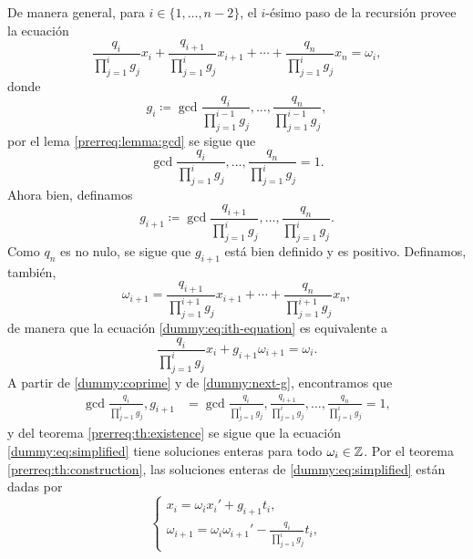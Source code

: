 De manera general, para $i \in \lbrace 1, \ldots, n - 2 \rbrace$, el $i$-ésimo paso de la recursión
provee la ecuación
\begin{equation}
	\label{dummy:eq:ith-equation}
	\frac{q_i}{\prod_{j=1}^{i}g_j}x_i
	+ \frac{q_{i+1}}{\prod_{j=1}^{i}g_j}x_{i+1}
	+ \cdots
	+ \frac{q_{n}}{\prod_{j=1}^{i}g_j}x_n
	= \omega_i,
\end{equation}
donde
\begin{equation}
	\label{dummy:eq:ith-g}
	g_i \coloneq \gcd{\frac{q_i}{\prod_{j=1}^{i-1}g_j}, \ldots, \frac{q_n}{\prod_{j=1}^{i-1}g_j}},
\end{equation}
por el lema \ref{prerreq:lemma:gcd} se sigue que
\begin{equation}
	\label{dummy:coprime}
	\gcd{\frac{q_i}{\prod_{j=1}^{i}g_j}, \ldots, \frac{q_n}{\prod_{j=1}^{i}g_j}} = 1.
\end{equation}
Ahora bien, definamos
\begin{equation}
	\label{dummy:next-g}
	g_{i + 1} \coloneq \gcd{
		\frac{q_{i+1}}{\prod_{j=1}^{i}g_j},
		\ldots,
		\frac{q_{n}}{\prod_{j=1}^{i}g_j}
	}.
\end{equation}
Como $q_n$ es no nulo, se sigue que $g_{i + 1}$ está bien definido y es positivo. Definamos,
también,
\begin{equation*}
	\omega_{i+1} =
	\frac{q_{i+1}}{\prod_{j=1}^{i + 1}g_j}x_{i+1}
	+ \cdots +
	\frac{q_{n}}{\prod_{j=1}^{i + 1}g_j}x_{n},
\end{equation*}
de manera que la ecuación \eqref{dummy:eq:ith-equation} es equivalente a
\begin{equation}
	\label{dummy:eq:simplified}
	\frac{q_i}{\prod_{j=1}^{i}g_j}x_i + g_{i+1}\omega_{i+1} = \omega_i.
\end{equation}
A partir de \eqref{dummy:coprime} y de \eqref{dummy:next-g}, encontramos que
\begin{align*}
	\gcd{
		\frac{q_i}{\prod_{j=1}^{i}g_j},
		g_{i+1}
	}
	&=
	\gcd{
		\frac{q_i}{\prod_{j=1}^{i}g_j},
		\frac{q_{i+1}}{\prod_{j=1}^{i}g_j},
		\ldots,
		\frac{q_n}{\prod_{j=1}^{i}g_j}
	} = 1,
\end{align*}
y del teorema \ref{prerreq:th:existence} se sigue que la ecuación \eqref{dummy:eq:simplified}
tiene soluciones enteras para todo $\omega_i \in \mathbb{Z}$. Por el teorema \ref{prerreq:th:construction},
las soluciones enteras de \eqref{dummy:eq:simplified} están dadas por
\begin{equation}
	\label{eq:recurrence}
	\begin{cases}
		x_i = \omega_ix_i' + g_{i + 1}t_i, \\
		\omega_{i + 1} = \omega_i\omega_{i + 1}' - \frac{q_i}{\prod_{j=1}^{i}g_j}t_i,
	\end{cases}
\end{equation}
